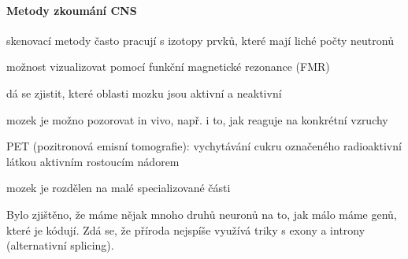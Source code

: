 \documentclass[DIV=8]{scrreprt}
\begin{document}
\paragraph{Metody zkoumání CNS}
\begin{myItemize}[nosep]
    \item skenovací metody často pracují s izotopy prvků, které mají liché počty neutronů
\begin{myItemize}[nosep]
    \item možnost vizualizovat pomocí funkční magnetické rezonance (FMR)
    \item dá se zjistit, které oblasti mozku jsou aktivní a neaktivní
    \item mozek je možno pozorovat in vivo, např. i to, jak reaguje na konkrétní vzruchy
    \item PET (pozitronová emisní tomografie): vychytávání cukru označeného radioaktivní látkou aktivním rostoucím nádorem
\end{myItemize}

    \item mozek je rozdělen na malé specializované části
\end{myItemize}



Bylo zjištěno, že máme nějak mnoho druhů neuronů na to, jak málo máme genů, které je kódují. Zdá se, že příroda nejspíše využívá triky s exony a introny (alternativní splicing).
\end{document}
